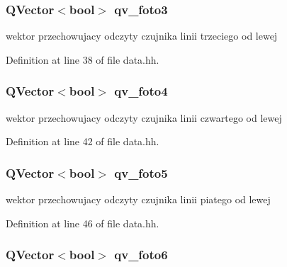 \subsubsection[{\texorpdfstring{qv\+\_\+foto3}{qv_foto3}}]{\setlength{\rightskip}{0pt plus 5cm}Q\+Vector$<$bool$>$ qv\+\_\+foto3}\hypertarget{data_8hh_a56f915a25afd677d0f17d41aa51f766e}{}\label{data_8hh_a56f915a25afd677d0f17d41aa51f766e}


wektor przechowujacy odczyty czujnika linii trzeciego od lewej 



Definition at line 38 of file data.\+hh.

\subsubsection[{\texorpdfstring{qv\+\_\+foto4}{qv_foto4}}]{\setlength{\rightskip}{0pt plus 5cm}Q\+Vector$<$bool$>$ qv\+\_\+foto4}\hypertarget{data_8hh_a3a8728d84ddfb363ef1dbd0e9b4e86f9}{}\label{data_8hh_a3a8728d84ddfb363ef1dbd0e9b4e86f9}


wektor przechowujacy odczyty czujnika linii czwartego od lewej 



Definition at line 42 of file data.\+hh.

\subsubsection[{\texorpdfstring{qv\+\_\+foto5}{qv_foto5}}]{\setlength{\rightskip}{0pt plus 5cm}Q\+Vector$<$bool$>$ qv\+\_\+foto5}\hypertarget{data_8hh_a22dfe1075776b28a5f66256ef08fdfec}{}\label{data_8hh_a22dfe1075776b28a5f66256ef08fdfec}


wektor przechowujacy odczyty czujnika linii piatego od lewej 



Definition at line 46 of file data.\+hh.

\subsubsection[{\texorpdfstring{qv\+\_\+foto6}{qv_foto6}}]{\setlength{\rightskip}{0pt plus 5cm}Q\+Vector$<$bool$>$ qv\+\_\+foto6}\hypertarget{data_8hh_a1e7c4fd7ccb2eca0520355dcbb83c10a}{}\label{data_8hh_a1e7c4fd7ccb2eca0520355dcbb83c10a}


